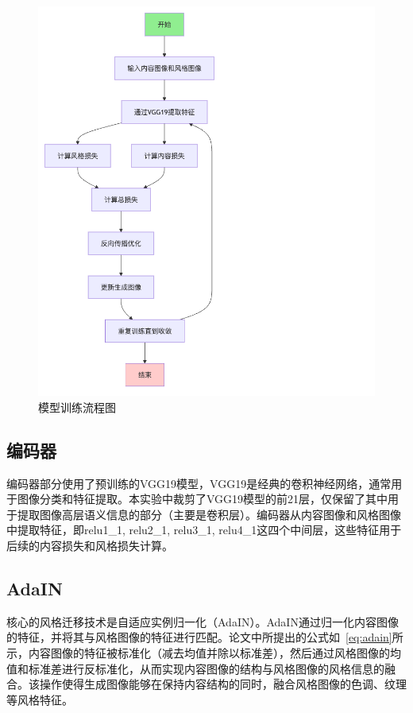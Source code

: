 \documentclass[UTF8,openany]{ctexbook}
\begin{document}
\begin{figure}[ht!]
    \centering
    \hspace*{2.5cm}
    \includegraphics[width=1.0\textwidth]{flow}
    \caption{模型训练流程图}
    \label{fig:model2}
\end{figure}

\subsection{编码器}

编码器部分使用了预训练的VGG19模型，VGG19是经典的卷积神经网络，通常用于图像分类和特征提取。本实验中裁剪了VGG19模型的前21层，仅保留了其中用于提取图像高层语义信息的部分（主要是卷积层）。编码器从内容图像和风格图像中提取特征，即relu1\_1, relu2\_1, relu3\_1, relu4\_1这四个中间层，这些特征用于后续的内容损失和风格损失计算。

\subsection{AdaIN}

核心的风格迁移技术是自适应实例归一化（AdaIN\cite{huang2017arbitrary}）。AdaIN通过归一化内容图像的特征，并将其与风格图像的特征进行匹配。论文中所提出的公式如~\ref{eq:adain}所示，内容图像的特征被标准化（减去均值并除以标准差），然后通过风格图像的均值和标准差进行反标准化，从而实现内容图像的结构与风格图像的风格信息的融合。该操作使得生成图像能够在保持内容结构的同时，融合风格图像的色调、纹理等风格特征。
\end{document}
